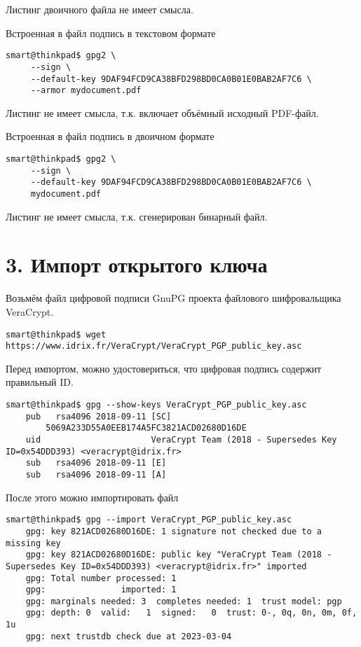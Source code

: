 Листинг двоичного файла не имеет смысла.

Встроенная в файл подпись в текстовом формате

\begin{Verbatim}[frame=single,breaklines=true,breakanywhere=true]
    smart@thinkpad$ gpg2 \
     --sign \
     --default-key 9DAF94FCD9CA38BFD298BD0CA0B01E0BAB2AF7C6 \
     --armor mydocument.pdf
\end{Verbatim}

Листинг не имеет смысла, т.к. включает объёмный исходный PDF-файл.

Встроенная в файл подпись в двоичном формате

\begin{Verbatim}[frame=single,breaklines=true,breakanywhere=true]
    smart@thinkpad$ gpg2 \
     --sign \
     --default-key 9DAF94FCD9CA38BFD298BD0CA0B01E0BAB2AF7C6 \
     mydocument.pdf
\end{Verbatim}

Листинг не имеет смысла, т.к. сгенерирован бинарный файл.

\section*{3. Импорт открытого ключа}

Возьмём файл цифровой подписи GnuPG проекта файлового шифровальщика VeraCrypt.

\begin{Verbatim}[frame=single,breaklines=true,breakanywhere=true]
    smart@thinkpad$ wget https://www.idrix.fr/VeraCrypt/VeraCrypt_PGP_public_key.asc
\end{Verbatim}

Перед импортом, можно удостовериться, что цифровая подпись содержит правильный ID.
\begin{Verbatim}[frame=single,breaklines=true,breakanywhere=true]
    smart@thinkpad$ gpg --show-keys VeraCrypt_PGP_public_key.asc
    pub   rsa4096 2018-09-11 [SC]
        5069A233D55A0EEB174A5FC3821ACD02680D16DE
    uid                      VeraCrypt Team (2018 - Supersedes Key ID=0x54DDD393) <veracrypt@idrix.fr>
    sub   rsa4096 2018-09-11 [E]
    sub   rsa4096 2018-09-11 [A]
\end{Verbatim}

После этого можно импортировать файл
\begin{Verbatim}[frame=single,breaklines=true,breakanywhere=true]
    smart@thinkpad$ gpg --import VeraCrypt_PGP_public_key.asc 
    gpg: key 821ACD02680D16DE: 1 signature not checked due to a missing key
    gpg: key 821ACD02680D16DE: public key "VeraCrypt Team (2018 - Supersedes Key ID=0x54DDD393) <veracrypt@idrix.fr>" imported
    gpg: Total number processed: 1
    gpg:               imported: 1
    gpg: marginals needed: 3  completes needed: 1  trust model: pgp
    gpg: depth: 0  valid:   1  signed:   0  trust: 0-, 0q, 0n, 0m, 0f, 1u
    gpg: next trustdb check due at 2023-03-04
\end{Verbatim}

